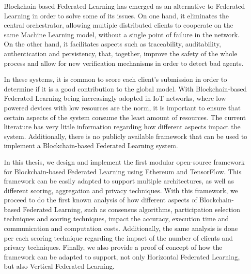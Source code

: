 Blockchain-based Federated Learning has emerged as an alternative to Federated Learning in order to solve some of its issues. On one hand, it eliminates the central orchestrator, allowing multiple distributed clients to cooperate on the same Machine Learning model, without a single point of failure in the network. On the other hand, it facilitates aspects such as traceability, auditability, authentication and persistency, that, together, improve the safety of the whole process and allow for new verification mechanisms in order to detect bad agents.

In these systems, it is common to score each client's submission in order to determine if it is a good contribution to the global model. With Blockchain-based Federated Learning being increasingly adopted in IoT networks, where low powered devices with low resources are the norm, it is important to ensure that certain aspects of the system consume the least amount of resources. The current literature has very little information regarding how different aspects impact the system. Additionally, there is no publicly available framework that can be used to implement a Blockchain-based Federated Learning system.

In this thesis, we design and implement the first modular open-source framework for Blockchain-based Federated Learning using Ethereum and TensorFlow. This framework can be easily adapted to support multiple architectures, as well as different scoring, aggregation and privacy techniques. With this framework, we proceed to do the first known analysis of how different aspects of Blockchain-based Federated Learning, such as consensus algorithms, participation selection techniques and scoring techniques, impact the accuracy, execution time and communication and computation costs. Additionally, the same analysis is done per each scoring technique regarding the impact of the number of clients and privacy techniques. Finally, we also provide a proof of concept of how the framework can be adapted to support, not only Horizontal Federated Learning, but also Vertical Federated Learning.